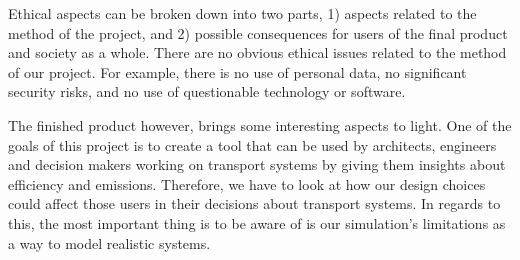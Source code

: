 
Ethical aspects can be broken down into two parts, 1) aspects related to the method of the project, and 2) possible consequences for users of the final product and society as a whole. There are no obvious ethical issues related to the method of our project. For example, there is no use of personal data, no significant security risks, and no use of questionable technology or software.

The finished product however, brings some interesting aspects to light. One of the goals of this project is to create a tool that can be used by architects, engineers and decision makers working on transport systems by giving them insights about efficiency and emissions. Therefore, we have to look at how our design choices could affect those users in their decisions about transport systems. In regards to this, the most important thing is to be aware of is our simulation's limitations as a way to model realistic systems.

